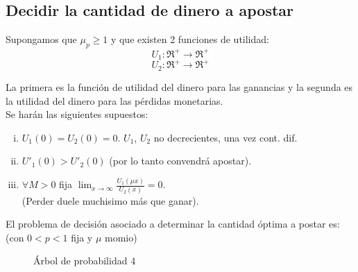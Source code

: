 \subsection{Decidir la cantidad de dinero a apostar}

Supongamos que $\mu_p \ge 1$ y que existen 2 funciones de utilidad:
\[U_1:\Re^+ \rightarrow \Re^+\]
\[U_2:\Re^+ \rightarrow \Re^+\]

La primera es la función de utilidad del dinero para las ganancias y la segunda es la utilidad del dinero para las pérdidas monetarias.\\

Se harán las siguientes supuestos:

\begin{enumerate}[(i)]
 \item $U_1(0)=U_2(0)=0$. $U_1$, $U_2$ no decrecientes, una vez cont. dif.
 \item $U'_1(0)>U'_2(0)$ (por lo tanto convendrá apostar).
 \item $\forall M>0$ fija $\displaystyle \lim_{x\rightarrow \infty} \frac{U_1(\mu x)}{U_2(x)}=0$.\\
 (Perder duele muchisimo más que ganar).
\end{enumerate}
El problema de decisión asociado a  determinar la cantidad óptima a postar es:(con $0<p<1$ fija y $\mu$ momio)\\

\begin{figure}[h]
 \begin{center}
\end{center}
\caption{Árbol de probabilidad 4}
\end{figure}



